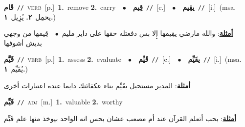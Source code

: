 \documentclass[10pt,a4paper,twoside]{article} %
\begin{document}
\begin{multicols}{2}
{\setlength\topsep{0pt}\textbf{\foreignlanguage{arabic}{قَام}}\ {\color{gray}\texttt{//}\color{black}}\ \textsc{verb}\ [p.]\ \textbf{1.}~remove  \textbf{2.}~carry\ \ $\bullet$\ \ \setlength\topsep{0pt}\textbf{\foreignlanguage{arabic}{قِيم}}\ {\color{gray}\texttt{//}\color{black}}\ [c.]\ \ $\bullet$\ \ \setlength\topsep{0pt}\textbf{\foreignlanguage{arabic}{يقِيم}}\ {\color{gray}\texttt{//}\color{black}}\ [i.]\ \color{gray}(msa. \foreignlanguage{arabic}{يحمِل}~\foreignlanguage{arabic}{\textbf{٢.}}  \foreignlanguage{arabic}{يُزِيل}~\foreignlanguage{arabic}{\textbf{١.}})\color{black}\  \begin{flushright}\color{gray}\foreignlanguage{arabic}{\textbf{\underline{\foreignlanguage{arabic}{أمثلة}}}: والله مارضي يقِيمها إِلا بس دفعتله حقها على داير مليم\ $\bullet$\ \  قِيمها من وجهي بديش أشوفها}\end{flushright}\color{black}} \vspace{2mm}

{\setlength\topsep{0pt}\textbf{\foreignlanguage{arabic}{قَيَّم}}\ {\color{gray}\texttt{//}\color{black}}\ \textsc{verb}\ [p.]\ \textbf{1.}~assess  \textbf{2.}~evaluate\ \ $\bullet$\ \ \setlength\topsep{0pt}\textbf{\foreignlanguage{arabic}{قَيِّم}}\ {\color{gray}\texttt{//}\color{black}}\ [c.]\ \ $\bullet$\ \ \setlength\topsep{0pt}\textbf{\foreignlanguage{arabic}{يقَيِّم}}\ {\color{gray}\texttt{//}\color{black}}\ [i.]\ \color{gray}(msa. \foreignlanguage{arabic}{يُقَيِّم}~\foreignlanguage{arabic}{\textbf{١.}})\color{black}\  \begin{flushright}\color{gray}\foreignlanguage{arabic}{\textbf{\underline{\foreignlanguage{arabic}{أمثلة}}}: المدير مستحيل يقَيِّم بناء عكفائتك دايما عنده اعتبارات أخرى}\end{flushright}\color{black}} \vspace{2mm}

{\setlength\topsep{0pt}\textbf{\foreignlanguage{arabic}{قَيِّم}}\ {\color{gray}\texttt{//}\color{black}}\ \textsc{adj}\ [m.]\ \textbf{1.}~valuable  \textbf{2.}~worthy\  \begin{flushright}\color{gray}\foreignlanguage{arabic}{\textbf{\underline{\foreignlanguage{arabic}{أمثلة}}}: بحب أتعلم القرآن عند أم مصعب عشان بحس انه الواحد بيوخذ منها علم قَيِّم}\end{flushright}\color{black}} \vspace{2mm}


\end{multicols}
\end{document}
